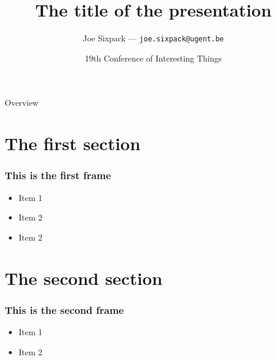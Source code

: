 \documentclass[aspectratio=169]{beamer}
\title{The title of the presentation}
\date{19th Conference of Interesting Things}
\author{Joe Sixpack --- \texttt{joe.sixpack@ugent.be}}
\begin{document}

\titleframe

\begin{frame}{Overview}
    \tableofcontents[hideallsubsections]
\end{frame}



\section{The first section}

\begin{frame}
    \frametitle{This is the first frame} 
    \begin{itemize}
        \item Item 1
        \item Item 2
        \item Item 2
    \end{itemize}
\end{frame}

\section{The second section}

\begin{frame}
    \frametitle{This is the second frame} 
    \begin{itemize}
        \item Item 1
        \item Item 2
    \end{itemize}
\end{frame}
\end{document}
